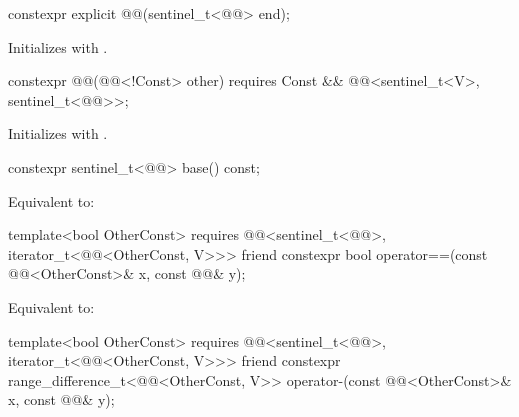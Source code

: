 %
\begin{itemdecl}
constexpr explicit @@(sentinel_t<@@> end);
\end{itemdecl}

\begin{itemdescr}
\pnum
\effects
Initializes  with .
\end{itemdescr}

%
\begin{itemdecl}
constexpr @@(@@<!Const> other)
  requires Const && @@<sentinel_t<V>, sentinel_t<@@>>;
\end{itemdecl}

\begin{itemdescr}
\pnum
\effects
Initializes  with .
\end{itemdescr}

%
\begin{itemdecl}
constexpr sentinel_t<@@> base() const;
\end{itemdecl}

\begin{itemdescr}
\pnum
\effects
Equivalent to: 
\end{itemdescr}

%
\begin{itemdecl}
template<bool OtherConst>
  requires @@<sentinel_t<@@>, iterator_t<@@<OtherConst, V>>>
friend constexpr bool operator==(const @@<OtherConst>& x, const @@& y);
\end{itemdecl}

\begin{itemdescr}
\pnum
\effects
Equivalent to: 
\end{itemdescr}

%
\begin{itemdecl}
template<bool OtherConst>
  requires @@<sentinel_t<@@>, iterator_t<@@<OtherConst, V>>>
friend constexpr range_difference_t<@@<OtherConst, V>>
  operator-(const @@<OtherConst>& x, const @@& y);
\end{itemdecl}


